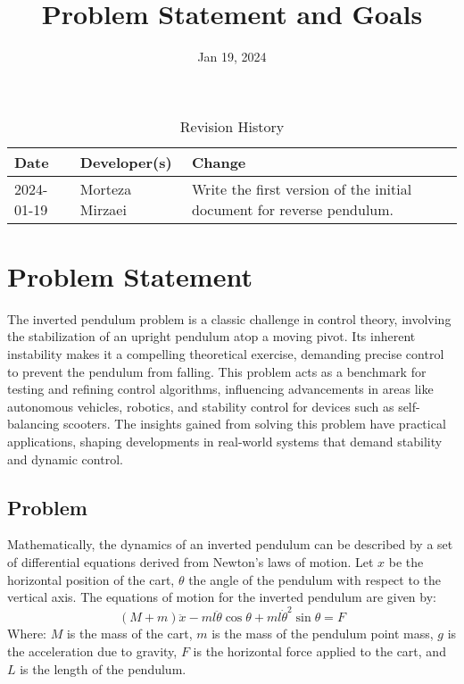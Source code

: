 \documentclass{article}
\title{Problem Statement and Goals\\\progname}
\author{\authname}
\date{Jan 19, 2024}
\begin{document}
\maketitle

\begin{table}[hp]
\caption{Revision History} \label{TblRevisionHistory}
\begin{tabularx}{\textwidth}{llX}
\toprule
\textbf{Date} & \textbf{Developer(s)} & \textbf{Change}\\
\midrule
2024-01-19 & Morteza Mirzaei & Write the first version of the initial document for reverse pendulum.\\
\bottomrule
\end{tabularx}
\end{table}

\section{Problem Statement}

The inverted pendulum problem is a classic challenge in control theory,
involving the stabilization of an upright pendulum atop a moving pivot.
Its inherent instability makes it a compelling theoretical exercise,
demanding precise control to prevent the pendulum from falling.
This problem acts as a benchmark for testing and refining control algorithms,
influencing advancements in areas like autonomous vehicles, robotics,
and stability control for devices such as self-balancing scooters.
The insights gained from solving this problem have practical applications,
shaping developments in real-world systems that demand stability
and dynamic control.


\subsection{Problem}
Mathematically, the dynamics of an inverted pendulum can be described
by a set of differential equations derived from Newton's laws of motion.
Let \(x\) be the horizontal position of the cart, \(\theta\) the angle
of the pendulum with respect to the vertical axis.
The equations of motion for the inverted pendulum are given by:
\[
(M+m)\ddot{x} -ml \ddot{\theta} \cos \theta + ml \dot{\theta}^2 \sin \theta = F
\]
Where: \(M\) is the mass of the cart,
\(m\) is the mass of the pendulum point mass,
\(g\) is the acceleration due to gravity,
\(F\) is the horizontal force applied to the cart,
and \(L\) is the length of the pendulum.
\end{document}
